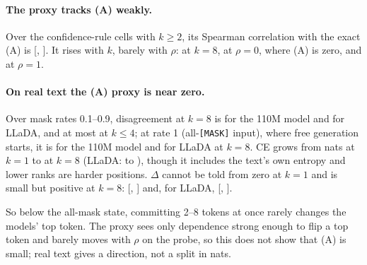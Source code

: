 \paragraph{The proxy tracks (A) weakly.}
Over the \CTwoTTenProbeNCells{} confidence-rule cells with $k\ge 2$, its Spearman
correlation with the exact (A) is \CTwoTTenProbeSpearman{} [\CTwoTTenProbeSpearmanLo,
\CTwoTTenProbeSpearmanHi]. It rises with $k$,
barely with $\rho$: at $k=8$, \CTwoTTenProbeDisatRhoZeroKEight{} at $\rho=0$, where (A) is zero,
and \CTwoTTenProbeDisatRhoOneKEight{} at $\rho=1$.

\paragraph{On real text the (A) proxy is near zero.}
Over mask rates 0.1--0.9,
disagreement at $k=8$ is \CTwoTTenDisKEight{} for the 110M model and \CTwoTTenLladaDisKEight{}
for LLaDA, and at most \CTwoTTenDisKFour{} at $k\le4$; at rate 1 (all-\texttt{[MASK]} input), where free generation
starts, it is \CTwoTTenDisKEightRateOne{} for the 110M model and \CTwoTTenLladaDisKEightRateOne{} for LLaDA at $k=8$. CE grows from \CTwoTTenCEKOne{} nats at
$k=1$ to \CTwoTTenCEKEight{} at $k=8$ (LLaDA: \CTwoTTenLladaCEKOne{} to
\CTwoTTenLladaCEKEight), though it includes the text's own entropy and lower ranks are harder
positions. $\Delta$ cannot be told from zero at $k=1$ and is small but positive at $k=8$:
\CTwoTTenDeltaKEight{} [\CTwoTTenDeltaKEightLo, \CTwoTTenDeltaKEightHi] and, for LLaDA,
\CTwoTTenLladaDeltaKEight{} [\CTwoTTenLladaDeltaKEightLo, \CTwoTTenLladaDeltaKEightHi].

So below the all-mask state, committing 2--8 tokens at once rarely changes the models' top
token. The proxy sees only dependence strong enough to flip a top token and barely moves with
$\rho$ on the probe, so this does not show that (A) is small; real text gives a direction, not a split in nats.
